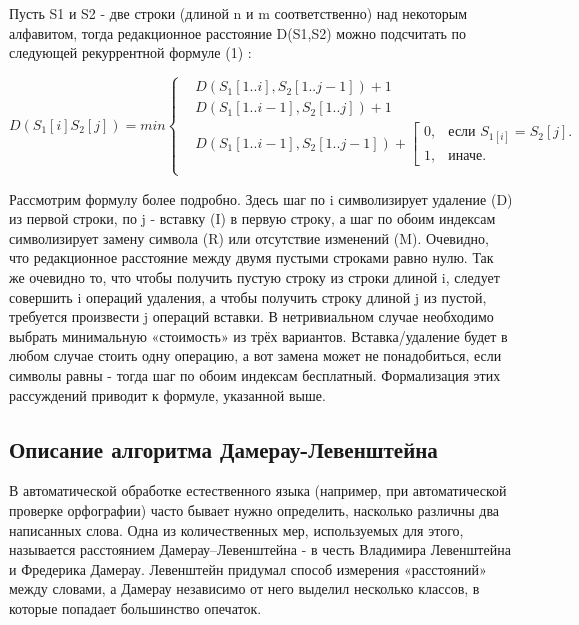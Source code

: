 \documentclass[a4paper,12pt]{article}
\begin{document}
Пусть S1 и S2 - две строки (длиной n и m соответственно) над
некоторым алфавитом, тогда редакционное расстояние D(S1,S2) можно 
подсчитать по следующей рекуррентной формуле (1) :

\begin{equation}
	D({S_{1}}[i]{S_{2}}[j]) = min \left\{
	\begin{array}{ll}
		& \mbox{$D(S_{1}[1..i],S_{2}[1..j-1]) + 1$}\\
		& \mbox{$D(S_{1}[1..i-1],S_{2}[1..j]) + 1$}\\
		& \mbox{$D(S_{1}[1..i-1],S_{2}[1..j-1]) + $$\left[
			\begin{array}{ll}
				0, & \mbox{если $S_{1[i]}=S_{2}[j]$}.\\
				1, & \mbox{иначе}.
			\end{array}\right.$}\\
	\end{array}
	\right.
\end{equation}

Рассмотрим формулу более подробно. Здесь шаг по i символизирует
удаление (D) из первой строки, по j - вставку (I) в первую строку, а шаг по
обоим индексам символизирует замену символа (R) или отсутствие
изменений (M). Очевидно, что редакционное расстояние между двумя
пустыми строками равно нулю. Так же очевидно то, что чтобы получить
пустую строку из строки длиной i, следует совершить i операций удаления, а
чтобы получить строку длиной j из пустой, требуется произвести j операций
вставки. В нетривиальном случае необходимо выбрать минимальную
«стоимость» из трёх вариантов. Вставка/удаление будет в любом случае
стоить одну операцию, а вот замена может не понадобиться, если символы
равны - тогда шаг по обоим индексам бесплатный. Формализация этих
рассуждений приводит к формуле, указанной выше. 

\subsection{Описание алгоритма Дамерау-Левенштейна}
\textbf{\qquad}В автоматической обработке естественного языка (например, при автоматической проверке орфографии) часто бывает нужно определить, насколько различны два написанных слова. Одна из количественных мер, используемых для этого, называется расстоянием Дамерау–Левенштейна - в честь Владимира Левенштейна и Фредерика Дамерау. Левенштейн придумал способ измерения «расстояний» между словами, а Дамерау независимо от него выделил несколько классов, в которые попадает большинство опечаток.
\end{document}
